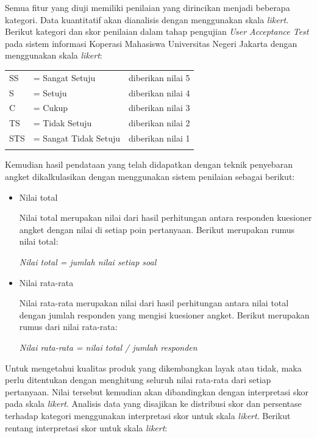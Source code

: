 Semua fitur yang diuji memiliki penilaian yang dirincikan menjadi beberapa kategori. Data kuantitatif akan dianalisis dengan menggunakan skala \textit{ likert}. Berikut kategori dan skor penilaian dalam tahap pengujian\textit{ User Acceptance Test} pada sistem informasi Koperasi Mahasiswa Universitas Negeri Jakarta dengan menggunakan skala \textit{likert}:\\

\begin{tabular}{lll}
SS& = Sangat Setuju& diberikan nilai 5\\
S& = Setuju& diberikan nilai 4\\
C& = Cukup& diberikan nilai 3\\
TS& = Tidak Setuju& diberikan nilai 2\\
STS& = Sangat Tidak Setuju& diberikan nilai 1\\
\\
\end{tabular}

Kemudian hasil pendataan yang telah didapatkan dengan teknik penyebaran angket dikalkulasikan dengan menggunakan sistem penilaian sebagai berikut:

\begin{itemize}
	\item Nilai total
	
	Nilai total merupakan nilai dari hasil perhitungan antara responden kuesioner angket dengan nilai di setiap poin pertanyaan. Berikut merupakan rumus nilai total:
	
	\textit{Nilai total = jumlah nilai setiap soal}
	
	\item Nilai rata-rata
	
	Nilai rata-rata merupakan nilai dari hasil perhitungan antara nilai total dengan jumlah responden yang mengisi kuesioner angket. Berikut merupakan rumus dari nilai rata-rata:

	\textit{Nilai rata-rata = nilai total / jumlah responden}
	
\end{itemize}

Untuk mengetahui kualitas produk yang dikembangkan layak atau tidak, maka perlu ditentukan dengan menghitung seluruh nilai rata-rata dari setiap pertanyaan. Nilai tersebut kemudian akan dibandingkan dengan interpretasi skor pada skala \textit{likert}. Analisis data yang disajikan ke distribusi skor dan persentase terhadap kategori menggunakan interpretasi skor untuk skala \textit{likert}. Berikut rentang interpretasi skor untuk skala \textit{likert}:\\

